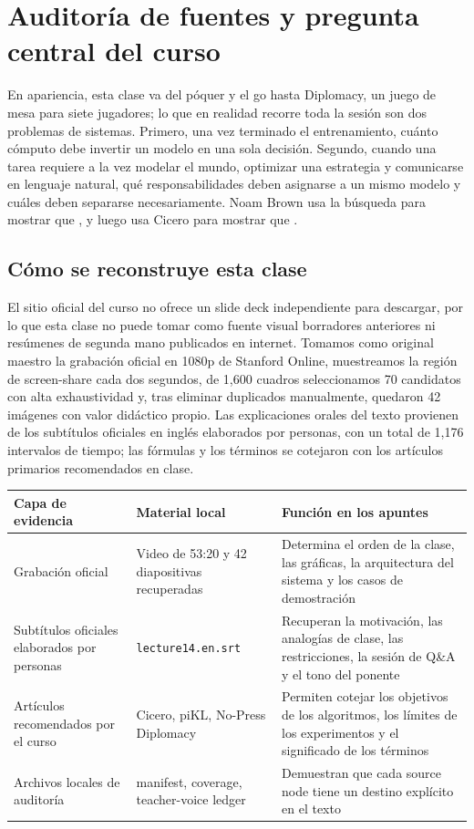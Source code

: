 \documentclass[a4paper]{article}
\begin{document}
\makecscover

\section{Auditoría de fuentes y pregunta central del curso}

En apariencia, esta clase va del póquer y el go hasta Diplomacy, un juego de mesa para siete jugadores; lo que en realidad recorre toda la sesión son dos problemas de sistemas. Primero, una vez terminado el entrenamiento, cuánto cómputo debe invertir un modelo en una sola decisión. Segundo, cuando una tarea requiere a la vez modelar el mundo, optimizar una estrategia y comunicarse en lenguaje natural, qué responsabilidades deben asignarse a un mismo modelo y cuáles deben separarse necesariamente. Noam Brown usa la búsqueda para mostrar que , y luego usa Cicero para mostrar que .

\subsection{Cómo se reconstruye esta clase}

El sitio oficial del curso no ofrece un slide deck independiente para descargar, por lo que esta clase no puede tomar como fuente visual borradores anteriores ni resúmenes de segunda mano publicados en internet. Tomamos como original maestro la grabación oficial en 1080p de Stanford Online, muestreamos la región de screen-share cada dos segundos, de 1,600 cuadros seleccionamos 70 candidatos con alta exhaustividad y, tras eliminar duplicados manualmente, quedaron 42 imágenes con valor didáctico propio. Las explicaciones orales del texto provienen de los subtítulos oficiales en inglés elaborados por personas, con un total de 1,176 intervalos de tiempo; las fórmulas y los términos se cotejaron con los artículos primarios recomendados en clase.

\begin{longtable}{L{0.22\textwidth}L{0.31\textwidth}L{0.37\textwidth}}
\toprule
Capa de evidencia & Material local & Función en los apuntes \\
\midrule
Grabación oficial & Video de 53:20 y 42 diapositivas recuperadas & Determina el orden de la clase, las gráficas, la arquitectura del sistema y los casos de demostración \\
Subtítulos oficiales elaborados por personas & \texttt{lecture14.en.srt} & Recuperan la motivación, las analogías de clase, las restricciones, la sesión de Q\&A y el tono del ponente \\
Artículos recomendados por el curso & Cicero, piKL, No-Press Diplomacy & Permiten cotejar los objetivos de los algoritmos, los límites de los experimentos y el significado de los términos \\
Archivos locales de auditoría & manifest, coverage, teacher-voice ledger & Demuestran que cada source node tiene un destino explícito en el texto \\
\bottomrule
\end{longtable}
\end{document}
